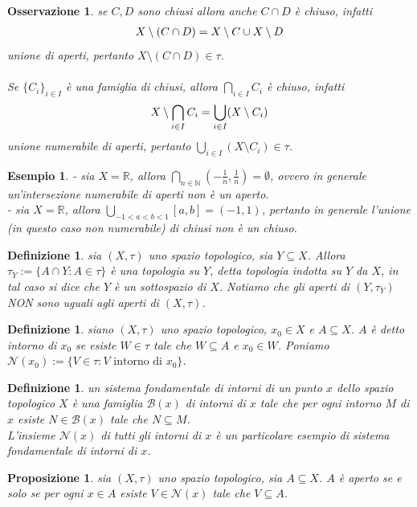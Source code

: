 \documentclass[oneside, 11pt]{amsbook}
\newcommand{\0}{{(0)}}
\newcommand{\3}{{(3)}}
\theoremstyle{colonplain}
\newtheorem{prop}[thm]{Proposizione}
\theoremstyle{colondefinition}
\newtheorem{defn}[thm]{Definizione}
\newtheorem{ex}[thm]{Esempio}
\theoremstyle{colonremark}
\newtheorem{rmk}[thm]{Osservazione}
\numberwithin{equation}{chapter}
\begin{document}
\begin{rmk}
se $C, D$ sono chiusi allora anche $C \cap D$ è chiuso, infatti
\begin{align}
    X \setminus (C \cap D) = X \setminus C \cup X \setminus D \notag
\end{align}
unione di aperti, pertanto $X \setminus (C \cap D) \in \tau$. \\ \\
Se $\{ C_i \}_{i \in I}$ è una famiglia di chiusi, allora $\bigcap_{i \in I} C_i$ è chiuso, infatti
\begin{align}
    X \setminus \bigcap_{i \in I} C_i = \bigcup_{i \in I} (X \setminus C_i) \notag
\end{align}
unione numerabile di aperti, pertanto $\bigcup_{i \in I} (X \setminus C_i) \in \tau$.
\end{rmk}
\begin{ex} - sia $X = \mathbb{R}$, allora $\bigcap_{n \in \mathbb{N}} \left(-\frac{1}{n}, \frac{1}{n}\right) = \emptyset$, ovvero in generale un'intersezione numerabile di aperti non è un aperto. \\
- sia $X = \mathbb{R}$, allora $\bigcup_{-1 < a < b < 1} [a, b] = (-1, 1)$, pertanto in generale l'unione (in questo caso non numerabile) di chiusi non è un chiuso.
\end{ex}
\begin{defn}
sia $(X, \tau)$ uno spazio topologico, sia $Y \subseteq X$. Allora $\tau_Y := \{ A \cap Y : A \in \tau \}$ è una topologia su $Y$, detta \textit{topologia indotta} su $Y$ da $X$, in tal caso si dice che $Y$ è un \textit{sottospazio} di $X$. Notiamo che gli aperti di $(Y, \tau_Y)$ NON sono uguali agli aperti di $(X, \tau)$.
\end{defn}
\begin{defn}
siano $(X, \tau)$ uno spazio topologico, $x_0 \in X$ e $A \subseteq X$. $A$ è detto \textit{intorno} di $x_0$ se esiste $W \in \tau$ tale che $W \subseteq A$ e $x_0 \in W$. Poniamo $\mathcal{N}(x_0) := \{ V \in \tau : V \text{ intorno di } x_0 \}$.
\end{defn}
\begin{defn}
un \textit{sistema fondamentale di intorni di un punto} $x$ dello spazio topologico $X$ è una famiglia $\mathcal{B}(x)$ di intorni di $x$ tale che per ogni intorno $M$ di $x$ esiste $N \in \mathcal{B}(x)$ tale che $N \subseteq M$. \\
L'insieme $\mathcal{N}(x)$ di tutti gli intorni di $x$ è un particolare esempio di sistema fondamentale di intorni di $x$.
\end{defn}
\begin{prop}
sia $(X, \tau)$ uno spazio topologico, sia $A \subseteq X$. $A$ è aperto se e solo se per ogni $x \in A$ esiste $V \in \mathcal{N}(x)$ tale che $V \subseteq A$.
\end{prop}
\end{document}
